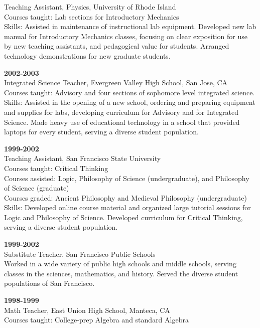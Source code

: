 \documentclass[letterpaper]{article}
\renewenvironment{itemize}{
  \begin{list}{}{
    \setlength{\leftmargin}{1.5em}
  }
}{
  \end{list}
}
\begin{document}
\begin{itemize}
	Teaching Assistant, Physics, University of Rhode Island \\  
	Courses taught: Lab sections for Introductory Mechanics   \\
	Skills: Assisted in maintenance of instructional lab equipment.  Developed new lab manual for Introductory Mechanics classes, focusing on clear exposition for use by new teaching assistants, and pedagogical value for students.  Arranged technology demonstrations for new graduate students. 
	\item \textbf{2002-2003}\\
	Integrated Science Teacher, Evergreen Valley High School, San Jose, CA  \\
	Courses taught: Advisory and four sections of sophomore level integrated science.\\  
	Skills: Assisted in the opening of a new school, ordering and preparing equipment and supplies for labs, developing curriculum for Advisory and for Integrated Science. Made heavy use of educational technology in a school that provided laptops for every student, serving a diverse student population.  
	\item \textbf{1999-2002} \\
	Teaching Assistant, San Francisco State University \\  
	Courses taught: Critical Thinking  \\
	Courses assisted: Logic, Philosophy of Science (undergraduate), and Philosophy of Science (graduate)  \\
	Courses graded: Ancient Philosophy and Medieval Philosophy (undergraduate) \\  
	Skills: Developed online course material and organized large tutorial sessions for Logic and Philosophy of Science.  Developed curriculum for Critical Thinking, serving a diverse student population.  
	\item \textbf{1999-2002} \\
	Substitute Teacher, San Francisco Public Schools \\  
	Worked in a wide variety of public high schools and middle schools, serving classes in the sciences, mathematics, and history.  Served the diverse student populations of San Francisco.  
	\item \textbf{1998-1999} \\
	Math Teacher, East Union High School, Manteca, CA \\  
	Courses taught: College-prep Algebra and standard Algebra \\  

\end{itemize}
\end{document}
